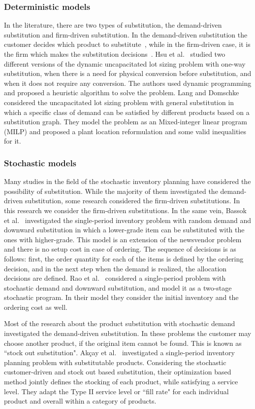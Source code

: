 \documentclass[10pt]{article}
\begin{document}
\subsubsection{Deterministic models}
In the literature, there are two types of substitution, the demand-driven substitution and firm-driven substitution. In the demand-driven substitution the customer decides which product to substitute~\cite{zeppetella2017optimal}, while in the firm-driven case, it is the firm which makes the substitution decisions~\cite{rao2004multi}. Hsu et al.~\cite{hsu2005dynamic} studied two different versions of the dynamic uncapacitated lot sizing problem with one-way substitution, when there is a need for physical conversion before substitution, and when it does not require any conversion. The authors used dynamic programming and proposed a heuristic algorithm to solve the problem.  Lang and Domschke~\cite{lang2010efficient} considered the uncapacitated lot sizing problem with general substitution in which a specific class of demand can be satisfied by different products based on a substitution graph. They model the problem as an Mixed-integer linear program (MILP) and proposed a plant location reformulation and some valid inequalities for it.
\subsubsection{Stochastic models}
Many studies in the field of the stochastic inventory planning have considered the possibility of substitution. While the majority of them investigated the demand-driven substitution, some research considered the firm-driven substitutions. In this research we consider the firm-driven substitutions. In the same vein, Bassok et al.~\cite{bassok1999single} investigated the single-period inventory problem with random demand and downward substitution in which a lower-grade item can be substituted with the ones with higher-grade. This model is an extension of the newsvendor problem and there is no setup cost in case of ordering. The sequence of decisions is as follows: first, the order quantity for each of the items is defined by the ordering decision, and in the next step when the demand is realized, the allocation decisions are defined. Rao et al.~\cite{rao2004multi} considered a single-period problem with stochastic demand and downward substitution, and model it as a two-stage stochastic program. In their model they consider the initial inventory and the ordering cost as well. 

Most of the research about the  product substitution with stochastic demand investigated the demand-driven substitution. In these problems the customer may choose another product, if the original item cannot be found. This is known as ``stock out substitution". Akçay et al.~\cite{akccaycategory} investigated a single-period inventory planning problem with substitutable products. Considering the stochastic customer-driven and stock out based substitution, their optimization based method jointly defines the stocking of each product, while satisfying a service level. They adapt the Type II service level or ``fill rate" for each individual product and overall within a category of products.  
\end{document}
